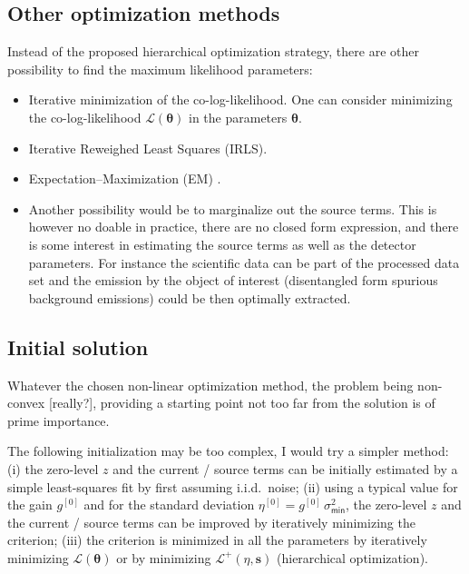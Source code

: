 \documentclass{aa}
\newcommand{\oops}[1]{\textcolor[named]{OrangeRed1}{#1}}
\newcommand*{\Tag}[1]{\mathsf{#1}}
\newcommand*{\V}[1]{\boldsymbol{#1}}   %
\newcommand*{\MC}[1]{\mathcal{#1}}
\newcommand*{\lkl}{\MC{L}}
\newcommand*{\lklplus}{\MC{L}^+}
\newcommand*{\Iter}[1]{^{[#1]}}
\begin{document}
\subsection{Other optimization methods}

Instead of the proposed hierarchical optimization strategy, there are other
possibility to find the maximum likelihood parameters:
\begin{itemize}
\item \oops{Iterative minimization of the co-log-likelihood.  One can consider
minimizing the co-log-likelihood $\lkl(\V\theta)$ in the parameters $\V\theta$.}

\item \oops{Iterative Reweighed Least Squares (IRLS).}

\item\oops{ Expectation--Maximization (EM)
\citep{Jezierska_et_al-2011-Poisson_Gaussian_noise}.}

\item \oops{Another possibility would be to marginalize out the source terms.
This is however no doable in practice, there are no closed form expression, and
there is some interest in estimating the source terms as well as the detector
parameters.  For instance the scientific data can be part of the processed data
set and the emission by the object of interest (disentangled form spurious
background emissions) could be then optimally extracted.}

\end{itemize}


\subsection{Initial solution}

Whatever the chosen non-linear optimization method, the problem being
non-convex \oops{[really?]}, providing a starting point not too far from the solution is of prime
importance.

\oops{The following initialization may be too complex, I would try a simpler
method: (i) the zero-level $z$ and the current / source terms can be initially
estimated by a simple least-squares fit by first assuming i.i.d.\ noise; (ii)
using a typical value for the gain $g\Iter0$ and for the standard deviation
$\eta\Iter0 = g\Iter0\,\sigma^2_\Tag{min}$, the zero-level $z$ and the
current / source terms can be improved by iteratively minimizing the criterion;
(iii) the criterion is minimized in all the parameters by iteratively minimizing
$\lkl(\V\theta)$ or by minimizing $\lklplus(\eta, \V s)$ (hierarchical
optimization).}
\end{document}
